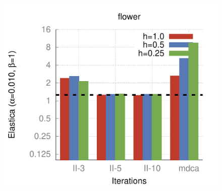 \begin{figure}[]
{\includegraphics[scale=0.4]{figures/chapter5/flow/plots/bars/length_pen_0.01000/flower.pdf}
}\hspace{0.25em}%
\hspace{0.25em}%
\subfloat{
}
\end{figure}
